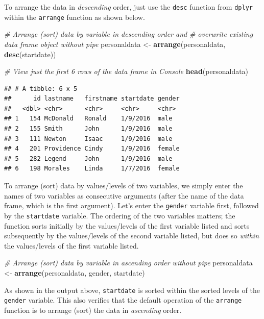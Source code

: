 \documentclass[]{book}
\newenvironment{Shaded}{\begin{snugshade}}{\end{snugshade}}
\newcommand{\KeywordTok}[1]{\textcolor[rgb]{0.13,0.29,0.53}{\textbf{#1}}}
\newcommand{\StringTok}[1]{\textcolor[rgb]{0.31,0.60,0.02}{#1}}
\newcommand{\CommentTok}[1]{\textcolor[rgb]{0.56,0.35,0.01}{\textit{#1}}}
\newcommand{\NormalTok}[1]{#1}
\begin{document}
To arrange the data in \emph{descending} order, just use the
\texttt{desc} function from \texttt{dplyr} within the \texttt{arrange}
function as shown below.

\begin{Shaded}
\begin{Highlighting}[]
\CommentTok{# Arrange (sort) data by variable in descending order and }
\CommentTok{# overwrite existing data frame object without pipe}
\NormalTok{personaldata <-}\StringTok{ }\KeywordTok{arrange}\NormalTok{(personaldata, }\KeywordTok{desc}\NormalTok{(startdate))}

\CommentTok{# View just the first 6 rows of the data frame in Console}
\KeywordTok{head}\NormalTok{(personaldata)}
\end{Highlighting}
\end{Shaded}

\begin{verbatim}
## # A tibble: 6 x 5
##      id lastname   firstname startdate gender
##   <dbl> <chr>      <chr>     <chr>     <chr> 
## 1   154 McDonald   Ronald    1/9/2016  male  
## 2   155 Smith      John      1/9/2016  male  
## 3   111 Newton     Isaac     1/9/2016  male  
## 4   201 Providence Cindy     1/9/2016  female
## 5   282 Legend     John      1/9/2016  male  
## 6   198 Morales    Linda     1/7/2016  female
\end{verbatim}

To arrange (sort) data by values/levels of two variables, we simply
enter the names of two variables as consecutive arguments (after the
name of the data frame, which is the first argument). Let's enter the
\texttt{gender} variable first, followed by the \texttt{startdate}
variable. The ordering of the two variables matters; the function sorts
initially by the values/levels of the first variable listed and sorts
subsequently by the values/levels of the second variable listed, but
does so \emph{within} the values/levels of the first variable listed.

\begin{Shaded}
\begin{Highlighting}[]
\CommentTok{# Arrange (sort) data by variable in ascending order without pipe}
\NormalTok{personaldata <-}\StringTok{ }\KeywordTok{arrange}\NormalTok{(personaldata, gender, startdate)}
\end{Highlighting}
\end{Shaded}

As shown in the output above, \texttt{startdate} is sorted within the
sorted levels of the \texttt{gender} variable. This also verifies that
the default operation of the \texttt{arrange} function is to arrange
(sort) the data in \emph{ascending} order.
\end{document}
